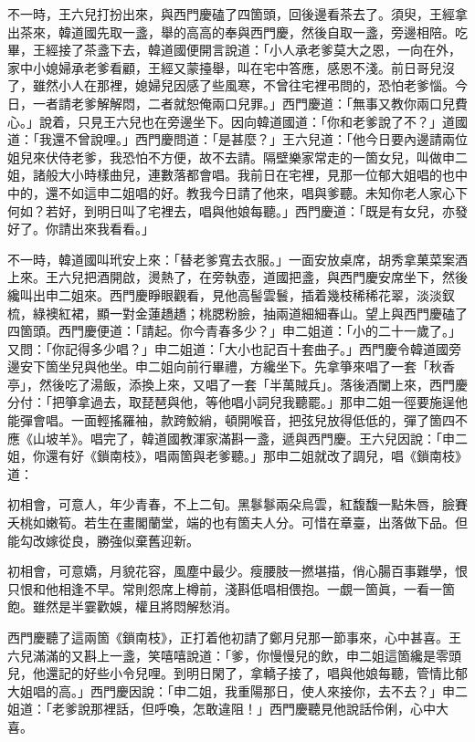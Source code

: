 不一時，王六兒打扮出來，與西門慶磕了四箇頭，回後邊看茶去了。須臾，王經拿出茶來，韓道國先取一盞，舉的高高的奉與西門慶，然後自取一盞，旁邊相陪。吃畢，王經接了茶盞下去，韓道國便開言說道：「小人承老爹莫大之恩，一向在外，家中小媳婦承老爹看顧，{}王經又蒙擡舉，叫在宅中答應，感恩不淺。前日哥兒沒了，雖然小人在那裡，媳婦兒因感了些風寒，不曾往宅裡弔問的，恐怕老爹惱。今日，一者請老爹解解悶，二者就恕俺兩口兒罪。」西門慶道：「無事又教你兩口兒費心。」說着，只見王六兒也在旁邊坐下。因向韓道國道：「你和老爹說了不？」道國道：「我還不曾說哩。」西門慶問道：「是甚麼？」王六兒道：「他今日要內邊請兩位姐兒來伏侍老爹，我恐怕不方便，故不去請。隔壁樂家常走的一箇女兒，叫做申二姐，諸般大小時樣曲兒，連數落都會唱。我前日在宅裡，見那一位郁大姐唱的也中中的，還不如這申二姐唱的好。教我今日請了他來，唱與爹聽。未知你老人家心下何如？若好，到明日叫了宅裡去，唱與他娘每聽。」西門慶道：「既是有女兒，亦發好了。你請出來我看看。」

不一時，韓道國叫玳安上來：「替老爹寬去衣服。」一面安放桌席，胡秀拿菓菜案酒上來。王六兒把酒開啟，燙熱了，在旁執壺，道國把盞，與西門慶安席坐下，然後纔叫出申二姐來。西門慶睜眼觀看，見他高髻雲鬟，插着幾枝稀稀花翠，淡淡釵梳，綠襖紅裙，顯一對金蓮趫趫；桃腮粉臉，抽兩道細細春山。{}望上與西門慶磕了四箇頭。西門慶便道：「請起。你今青春多少？」申二姐道：「小的二十一歲了。」又問：「你記得多少唱？」申二姐道：「大小也記百十套曲子。」西門慶令韓道國旁邊安下箇坐兒與他坐。申二姐向前行畢禮，方纔坐下。先拿箏來唱了一套「秋香亭」，然後吃了湯飯，添換上來，又唱了一套「半萬賊兵」。落後酒闌上來，西門慶分付：「把箏拿過去，取琵琶與他，等他唱小詞兒我聽罷。」那申二姐一徑要施逞他能彈會唱。一面輕搖羅袖，款跨鮫綃，頓開喉音，把弦兒放得低低的，彈了箇四不應《山坡羊》。唱完了，韓道國教渾家滿斟一盞，遞與西門慶。王六兒因說：「申二姐，你還有好《鎖南枝》，唱兩箇與老爹聽。」那申二姐就改了調兒，唱《鎖南枝》道：

\begin{myquote}
初相會，可意人，年少青春，不上二旬。黑鬖鬖兩朵烏雲，紅馥馥一點朱唇，臉賽夭桃如嫩筍。若生在畫閣蘭堂，端的也有箇夫人分。可惜在章臺，出落做下品。但能勾改嫁從良，勝強似棄舊迎新。

初相會，可意嬌，月貌花容，風塵中最少。瘦腰肢一撚堪描，俏心腸百事難學，恨只恨和他相逢不早。常則怨席上樽前，淺斟低唱相偎抱。一覷一箇眞，一看一箇飽。雖然是半霎歡娛，權且將悶解愁消。
\end{myquote}

西門慶聽了這兩箇《鎖南枝》，正打着他初請了鄭月兒那一節事來，心中甚喜。王六兒滿滿的又斟上一盞，笑嘻嘻說道：「爹，你慢慢兒的飲，申二姐這箇纔是零頭兒，{}他還記的好些小令兒哩。到明日閑了，拿轎子接了，唱與他娘每聽，管情比郁大姐唱的高。」西門慶因說：「申二姐，我重陽那日，使人來接你，去不去？」申二姐道：「老爹說那裡話，但呼喚，怎敢違阻！」西門慶聽見他說話伶俐，心中大喜。


